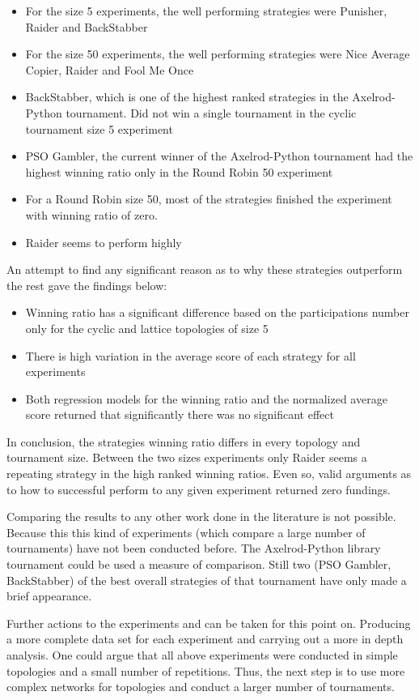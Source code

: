 \begin{itemize}
  \item For the size 5 experiments, the well performing strategies were Punisher,
        Raider and BackStabber
  \item For the size 50 experiments, the well performing strategies were Nice
        Average Copier, Raider and Fool Me Once
  \item BackStabber, which is one of the highest ranked strategies in the
        Axelrod-Python tournament. Did not win a single tournament in the cyclic
        tournament size 5 experiment
  \item PSO Gambler, the current winner of the Axelrod-Python tournament had the
        highest winning ratio only in the Round Robin 50 experiment
  \item For a Round Robin size 50, most of the strategies finished the experiment
        with winning ratio of zero.
  \item Raider seems to perform highly
\end{itemize}

An attempt to find any significant reason as to why these strategies outperform
the rest gave the findings below:

\begin{itemize}
  \item Winning ratio has a significant difference based on the participations
        number only for the cyclic and lattice topologies of size 5
  \item There is high variation in the average score of each strategy for all
        experiments
  \item Both regression models for the winning ratio and the normalized average
        score returned that significantly there was no significant effect
\end{itemize}

In conclusion, the strategies winning ratio differs in every topology and
tournament size.
Between the two sizes experiments only Raider seems a repeating strategy in the
high ranked winning ratios. Even so, valid arguments as to how to
successful perform to any given experiment returned zero fundings.

Comparing the results to any other work done in the literature is not possible.
Because this this kind of experiments (which compare a large number of tournaments)
have not been conducted before.
The Axelrod-Python library tournament could be used  a measure of comparison.
Still two (PSO Gambler, BackStabber) of the best overall strategies of that
tournament have only made a brief appearance.

Further actions to the experiments and can be taken for this point on.
Producing a more complete data set for each experiment and carrying out a more
in depth analysis. One could argue that all above experiments
were conducted in simple topologies and a small number of repetitions. Thus, the
next step is to use more complex networks for topologies and conduct a larger
number of tournaments.
